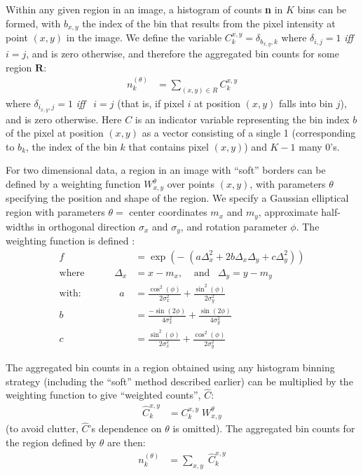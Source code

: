 \documentclass[
    ,final            %
  ]
  {aipproc}
\begin{document}
Within any given region in an image, a histogram of counts \textbf{n} in $K$ bins can be formed, with $b_{x,y}$ the index of the bin that results from the pixel intensity at point $(x,y)$ in the image.
We define the variable $C^{x,y}_k =\delta_{b_{x,y},k}$ where $\delta_{i,j}=1$ {\it iff} \, $i=j$, and is zero otherwise, and therefore the aggregated bin counts for some region $\mathbf{R}$:
\begin{align}
n_k^{(\theta)} &= \sum_{(x,y) \in R} C^{x,y}_k
\end{align}
where $\delta_{i_{x,y},j}=1$ {\it iff} \, $i=j$ (that is, if pixel $i$ at position $(x,y)$ falls into bin $j$), and is zero otherwise. Here $C$ is an indicator variable 
representing the bin index $b$ of the pixel at position $(x,y)$ as a vector consisting of a single 1 (corresponding to $b_k$, the index of the bin $k$ that contains pixel $(x,y)$) and $K-1$ many 0's. 

For two dimensional data, a region in an image with ``soft'' borders can be defined by a weighting function $W^{\theta}_{x,y}$ over points $(x,y)$, with
parameters $\theta$ specifying the position and shape of the region.
We specify a Gaussian elliptical region with parameters $\theta =$ center coordinates $m_x$ and $m_y$, approximate half-widths in orthogonal direction $\sigma_x$ and
$\sigma_y$, and rotation parameter $\phi$. 
The weighting function is defined \cite{rencher2003methods}:
\begin{align}
f &= \exp\left(- \;\left(a\Delta_x^2+2b\Delta_x\Delta_y+c\Delta_y^2 \right) \right)\label{eq:region-weight-in-2d-simpl} \\
\text{where} \;\;\;\;\;\;\;\;\;\;\;
\Delta_x &= x-m_x, \;\;\;\;\text{and} \;\;\; \Delta_y = y-m_y  \label{eq:Delta-defn}  \\
\text{with:} \;\;\;\;\;\;\;\;\;\;\;\;\;\;
a &= \frac{\cos^2(\phi)}{2\sigma_x^2} + \frac{\sin^2(\phi)}{2\sigma_y^2} \label{eq:a-wgt} \\
b &= \frac{-\sin(2\phi)}{4\sigma_x^2} + \frac{\sin(2\phi)}{4\sigma_y^2} \label{eq:b-wgt} \\
c &= \frac{\sin^2(\phi)}{2\sigma_x^2} + \frac{\cos^2(\phi)}{2\sigma_y^2} \label{eq:c-wgt}
\end{align}

The aggregated bin counts in a region obtained using any histogram binning strategy (including the ``soft'' method described earlier) can be multiplied by the weighting function to give ``weighted counts'', $\hat{C}$:
\begin{align}
\hat{C}^{x,y}_k &= C^{x,y}_k  \; W^{\theta}_{x,y}
\end{align}
(to avoid clutter, $\hat{C}$'s dependence on $\theta$ is omitted). The aggregated bin counts for the region defined by $\theta$ are then:
\begin{align}
n_k^{(\theta)} 
&= \sum_{x,y} \; \hat{C}^{x,y}_k  \label{eq:soft-bin-counts-2d} 
\end{align}
\end{document}
